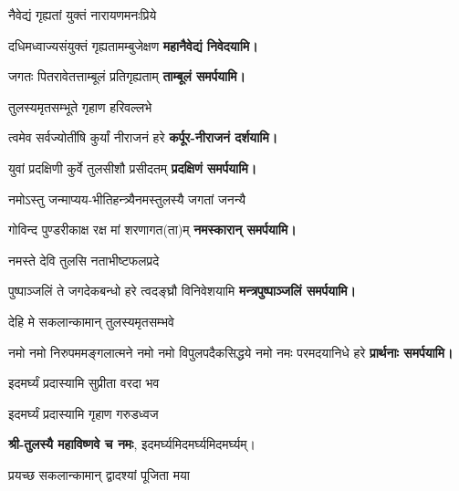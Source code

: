 \begin{center}
{नैवेद्यं गृह्यतां युक्तं नारायणमनःप्रिये}

{दधिमध्वाज्यसंयुक्तं गृह्यतामम्बुजेक्षण}
\textbf{\devAya{} महानैवेद्यं निवेदयामि।}
\medskip

{जगतः पितरावेतत्ताम्बूलं प्रतिगृह्यताम्}
\textbf{\devAya{} ताम्बूलं समर्पयामि।}
\medskip

{तुलस्यमृतसम्भूते गृहाण हरिवल्लभे}

{त्वमेव सर्वज्योतींषि कुर्यां नीराजनं हरे}
\textbf{\devAya{} कर्पूर-नीराजनं दर्शयामि।}
\medskip

{युवां प्रदक्षिणी कुर्वे तुलसीशौ प्रसीदतम्}
\textbf{\devAya{} प्रदक्षिणं समर्पयामि।}
\medskip

{नमोऽस्तु जन्माप्यय-भीतिहन्त्र्यै}{नमस्तुलस्यै जगतां जनन्यै}

{गोविन्द पुण्डरीकाक्ष रक्ष मां शरणागत(ता)म्}
\textbf{\devAya{} नमस्कारान् समर्पयामि।}
\medskip

{नमस्ते देवि तुलसि नताभीष्टफलप्रदे}

{पुष्पाञ्जलिं ते जगदेकबन्धो हरे त्वदङ्घ्रौ विनिवेशयामि}
\textbf{\devAya{} मन्त्रपुष्पाञ्जलिं समर्पयामि।}
\medskip

{देहि मे सकलान्कामान् तुलस्यमृतसम्भवे}

{नमो नमो निरुपममङ्गलात्मने}
{नमो नमो विपुलपदैकसिद्धये}
{नमो नमः परमदयानिधे हरे}
\nopagebreak[4]\textbf{\devAya{} प्रार्थनाः समर्पयामि।}
\medskip

{इदमर्घ्यं प्रदास्यामि सुप्रीता वरदा भव}

{इदमर्घ्यं प्रदास्यामि गृहाण गरुडध्वज}

\textbf{श्री-तुलस्यै महाविष्णवे च नमः}, इदमर्घ्यमिदमर्घ्यमिदमर्घ्यम्।

{प्रयच्छ सकलान्कामान् द्वादश्यां पूजिता मया}


\end{center}
